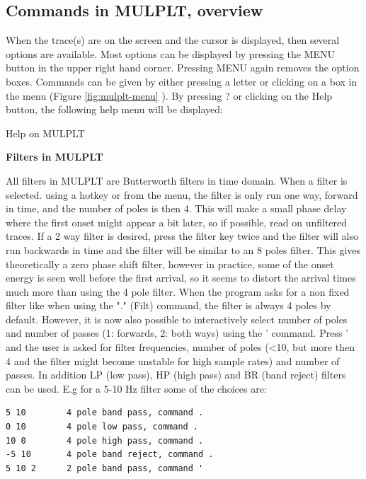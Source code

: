 \subsection{Commands in MULPLT, overview}
\label{subs:commands-mulplt}

When the trace(s) are on the screen and the cursor is displayed, then several options are available. Most options can be displayed by pressing the MENU button in the upper right hand corner. Pressing MENU again removes the option boxes. Commands can be given by either pressing a letter or clicking on a box in the menu (Figure 
\ref{fig:mulplt-menu}
). By pressing ? or clicking on the Help button, the following help menu will be displayed: 

Help on MULPLT 

%


 
\textbf{Filters in MULPLT}



All filters in MULPLT are Butterworth filters in time domain. When a filter is selected. using a hotkey or from the menu, the filter is only run one way, forward in time, and the number of poles is then 4. This will make a small phase delay where the first onset might appear a bit later, so if possible, read on unfiltered traces. If a 2 way filter is desired, press the filter key twice and the filter will also run backwards in time and the filter will be similar to an 8 poles filter. This gives theoretically a zero phase shift filter, however in practice, some of the onset energy is seen well before the first arrival, so it seems to distort the arrival times much more than using the 4 pole filter. When the program asks for a non fixed filter like when using the "." (Filt) command, the filter is always 4 poles by default. However, it is now also possible to interactively select number of poles and number of passes (1: forwards, 2: both ways)  using the ' command. Press ' and the user is asked for filter frequencies, number of poles (<10, but more then 4 and the filter might become unstable for high sample rates) and number of passes. In addition LP (low pass), HP (high pass) and BR (band reject) filters can be used. E.g for a 5-10 Hz filter some of the choices are:

\begin{verbatim}
5 10        4 pole band pass, command .
0 10        4 pole low pass, command .
10 0        4 pole high pass, command .
-5 10       4 pole band reject, command .
5 10 2      2 pole band pass, command '
\end{verbatim}

